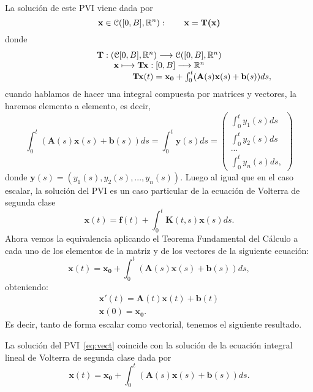 La solución de este PVI viene dada por
\begin{equation}
	\textbf{x} \in \mathcal{C}([0,B],\mathbb{R}^n): \qquad \textbf{x} = \textbf{T(x)}
\end{equation}
donde 
\begin{equation}
	\begin{array}{c}
		\textbf{T}: (\mathcal{C}[0,B], \mathbb{R}^n) \longrightarrow \mathcal{C}([0,B],\mathbb{R}^n) \\  \textbf{x} \longmapsto \textbf{Tx}:[0,B] \longrightarrow \mathbb{R}^n \\  \qquad \qquad \qquad \qquad \qquad \textbf{Tx}(t)= \textbf{x}_\textbf{0} + \int_0^t (\textbf{A}(s)\textbf{x}(s)+\textbf{b}(s))ds,
	\end{array}
\end{equation}
cuando hablamos de hacer una integral compuesta por matrices y vectores, la haremos elemento a elemento, es decir,
\begin{equation}
	\int_0^t (\textbf{A}(s)\textbf{x}(s)+\textbf{b}(s))ds = \int_0^t \textbf{y}(s)ds = \begin{pmatrix}
		\int_0^t y_1(s)ds \\ \int_0^t y_2(s)ds \\ ... \\ \int_0^t y_n(s)ds,
	\end{pmatrix}
\end{equation}
donde $\textbf{y}(s) = (y_1(s),y_2(s),...,y_n(s))$. Luego al igual que en el caso escalar, la solución del PVI es un caso particular de la ecuación de Volterra de segunda clase
\begin{equation}
	\textbf{x}(t) = \textbf{f}(t) + \int_0^t \textbf{K}(t,s)\textbf{x}(s)ds.
\end{equation}
Ahora vemos la equivalencia aplicando el Teorema Fundamental del Cálculo a cada uno de los elementos de la matriz y de los vectores de la siguiente ecuación:
\begin{equation}
	\textbf{x}(t)= \textbf{x}_\textbf{0} + \int_0^t (\textbf{A}(s)\textbf{x}(s)+\textbf{b}(s))ds,
\end{equation}
obteniendo:
\begin{equation}
	\begin{array}{c}
		\textbf{x}'(t) = \textbf{A}(t)\textbf{x}(t)+\textbf{b}(t) \\ \textbf{x}(0) = \textbf{x}_\textbf{0}.
	\end{array}
\end{equation}
Es decir, tanto de forma escalar como vectorial, tenemos el siguiente resultado.
\begin{corolario}
	La solución del PVI~\eqref{eq:vect} coincide con la solución de la ecuación integral lineal de Volterra de segunda clase dada por
	\begin{equation}
		\textbf{x}(t)= \textbf{x}_\textbf{0} + \int_0^t (\textbf{A}(s)\textbf{x}(s)+\textbf{b}(s))ds.
	\end{equation}
\end{corolario}
\endinput
-